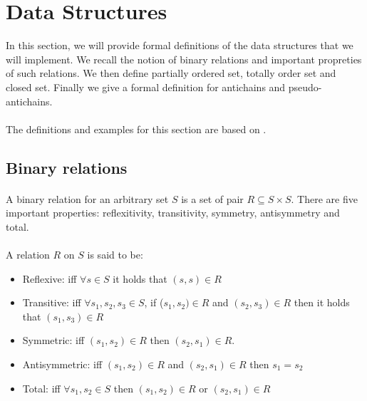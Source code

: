 \documentclass[letterpaper]{article}
\theoremstyle{definition}
\begin{document}
\section{Data Structures}

\label{data_structures}

In this section, we will provide formal definitions of the data
structures that we will implement. We recall the notion of binary relations
and important propreties of such relations.
We then define partially ordered set, totally order set and closed set.
Finally we give a formal definition for antichains and pseudo-antichains.

\paragraph{}

The definitions and examples for this section are based on \cite{bohy_phd}.


\subsection{Binary relations}

\paragraph{}

A binary relation for an arbitrary set $S$ is
a set of pair $R \subseteq S \times S$.
There are five important properties: reflexitivity, transitivity,
symmetry, antisymmetry and total.

\paragraph{}

A relation $R$ on $S$ is said to be:

\begin{itemize}
    \item Reflexive:
    iff $\forall s \in S$ it holds that $(s, s) \in R$
    \item Transitive:
    iff $\forall s_1, s_2, s_3 \in S$,
    if ($s_1, s_2) \in R$ and $(s_2, s_3) \in R$
    then it holds that $(s_1, s_3) \in R$
    \item Symmetric: iff $(s_1, s_2) \in R$ then $(s_2, s_1) \in R$.
    \item Antisymmetric: iff $(s_1, s_2) \in R$
    and $(s_2, s_1) \in R$ then $s_1 = s_2$
    \item Total: iff $\forall s_1, s_2 \in S$ then $(s_1, s_2) \in R$
    or $(s_2, s_1) \in R$

\end{itemize}
\end{document}
